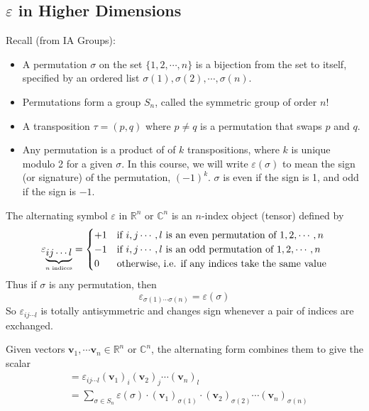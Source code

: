 \documentclass{article}
\begin{document}
	\subsection{$\varepsilon$ in Higher Dimensions}
	Recall (from IA Groups):
	\begin{itemize}
		\item A permutation $\sigma$ on the set $\{ 1, 2, \cdots, n \}$ is a bijection from the set to itself, specified by an ordered list $\sigma(1), \sigma(2), \cdots, \sigma(n)$.
		\item Permutations form a group $S_n$, called the symmetric group of order $n!$
		\item A transposition $\tau = (p, q)$ where $p \neq q$ is a permutation that swaps $p$ and $q$.
		\item Any permutation is a product of of $k$ transpositions, where $k$ is unique modulo 2 for a given $\sigma$. In this course, we will write $\varepsilon(\sigma)$ to mean the sign (or signature) of the permutation, $(-1)^k$. $\sigma$ is even if the sign is 1, and odd if the sign is $-1$.
	\end{itemize}
	The alternating symbol $\varepsilon$ in $\mathbb R^n$ or $\mathbb C^n$ is an $n$-index object (tensor) defined by
	\[ \varepsilon_{\underbrace{ij\cdots l}_{\mathclap{n \text{ indices}}}} = \begin{cases}
		+1 & \text{if } i, j \cdots, l \text{ is an even permutation of } 1, 2, \cdots, n \\
		-1 & \text{if } i, j \cdots, l \text{ is an odd permutation of } 1, 2, \cdots, n \\
		0 & \text{otherwise, i.e. if any indices take the same value}
	\end{cases} \]
	Thus if $\sigma$ is any permutation, then
	\[ \varepsilon_{\sigma(1)\cdots\sigma(n)} = \varepsilon(\sigma) \]
	So $\varepsilon_{ij\cdots l}$ is totally antisymmetric and changes sign whenever a pair of indices are exchanged.
	\begin{definition}
		Given vectors $\bm v_1, \cdots \bm v_n \in \mathbb R^n$ or $\mathbb C^n$, the alternating form combines them to give the scalar
		\begin{align*}
			[\bm v_1, \bm v_2, \cdots, \bm v_n ] &= \varepsilon_{ij\cdots l} (\bm v_1)_i (\bm v_2)_j \cdots (\bm v_n)_l \\
			&= \sum_{\sigma \in S_n} \varepsilon(\sigma) \cdot (\bm v_1)_{\sigma(1)} \cdot (\bm v_2)_{\sigma(2)} \cdots (\bm v_n)_{\sigma(n)}
		\end{align*}
	\end{definition}
\end{document}
